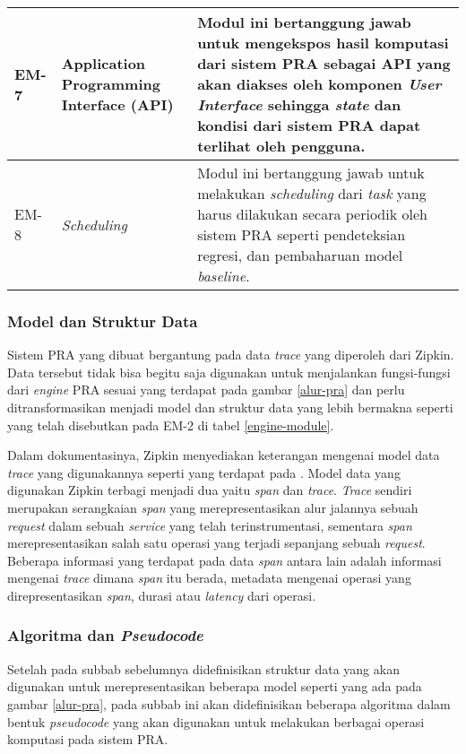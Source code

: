 \begin{small}
\begin{longtable}{ | p{1cm} | p{3cm} | p{10cm} | }
		EM-7 & Application Programming Interface (API) & Modul ini bertanggung jawab untuk mengekspos hasil komputasi dari sistem PRA sebagai API yang akan diakses oleh komponen \textit{User Interface} sehingga \textit{state} dan kondisi dari sistem PRA dapat terlihat oleh pengguna. \\ \hline
		EM-8 & \textit{Scheduling} & Modul ini bertanggung jawab untuk melakukan \textit{scheduling} dari \textit{task} yang harus dilakukan secara periodik oleh sistem PRA seperti pendeteksian regresi, dan pembaharuan model \textit{baseline}. \\ \hline
	\end{longtable}
\end{small}

\subsubsection{Model dan Struktur Data}
Sistem PRA yang dibuat bergantung pada data \textit{trace} yang diperoleh dari Zipkin. Data tersebut tidak bisa begitu saja digunakan untuk menjalankan fungsi-fungsi dari \textit{engine} PRA sesuai yang terdapat pada gambar \ref{alur-pra} dan perlu ditransformasikan menjadi model dan struktur data yang lebih bermakna seperti yang telah disebutkan pada EM-2 di tabel \ref{engine-module}.

Dalam dokumentasinya, Zipkin menyediakan keterangan mengenai model data \textit{trace} yang digunakannya seperti yang terdapat pada \citep{zipkin-data}. Model data yang digunakan Zipkin terbagi menjadi dua yaitu \textit{span} dan \textit{trace}. \textit{Trace} sendiri merupakan serangkaian \textit{span} yang merepresentasikan alur jalannya sebuah \textit{request} dalam sebuah \textit{service} yang telah terinstrumentasi, sementara \textit{span} merepresentasikan salah satu operasi yang terjadi sepanjang sebuah \textit{request}. Beberapa informasi yang terdapat pada data \textit{span} antara lain adalah informasi mengenai \textit{trace} dimana \textit{span} itu berada, metadata mengenai operasi yang direpresentasikan \textit{span}, durasi atau \textit{latency} dari operasi.







\subsubsection{Algoritma dan \textit{Pseudocode}}
Setelah pada subbab sebelumnya didefinisikan struktur data yang akan digunakan untuk merepresentasikan beberapa model seperti yang ada pada gambar \ref{alur-pra}, pada subbab ini akan didefinisikan beberapa algoritma dalam bentuk \textit{pseudocode} yang akan digunakan untuk melakukan berbagai operasi komputasi pada sistem PRA.




